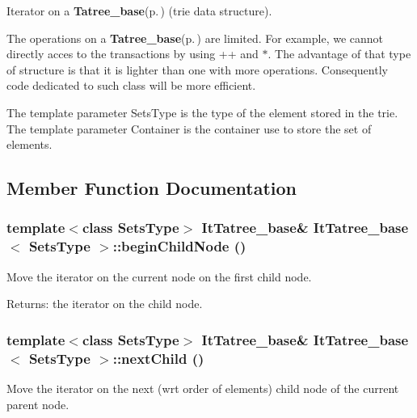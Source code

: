 Iterator on a {\bf Tatree\_\-base}{\rm (p.\,\pageref{class_tatree__base})} (trie data structure). 

The operations on a {\bf Tatree\_\-base}{\rm (p.\,\pageref{class_tatree__base})} are limited. For example, we cannot directly acces to the transactions by using ++ and $\ast$. The advantage of that type of structure is that it is lighter than one with more operations. Consequently code dedicated to such class will be more efficient.

The template parameter Sets\-Type is the type of the element stored in the trie. The template parameter Container is the container use to store the set of elements. 



\subsection{Member Function Documentation}
\subsubsection{\setlength{\rightskip}{0pt plus 5cm}template$<$class Sets\-Type$>$ {\bf It\-Tatree\_\-base}\& {\bf It\-Tatree\_\-base}$<$ Sets\-Type $>$::begin\-Child\-Node ()\hspace{0.3cm}{\tt  [inline]}}\label{class_it_tatree__base_1f220df0efabdc43af17b18b676ff72e}


Move the iterator on the current node on the first child node. 

\begin{Desc}
\item[Returns:]the iterator on the child node. \end{Desc}
\subsubsection{\setlength{\rightskip}{0pt plus 5cm}template$<$class Sets\-Type$>$ {\bf It\-Tatree\_\-base}\& {\bf It\-Tatree\_\-base}$<$ Sets\-Type $>$::next\-Child ()\hspace{0.3cm}{\tt  [inline]}}\label{class_it_tatree__base_5b89e54c0ffe5036b41f32842e4eb8b7}


Move the iterator on the next (wrt order of elements) child node of the current parent node. 

